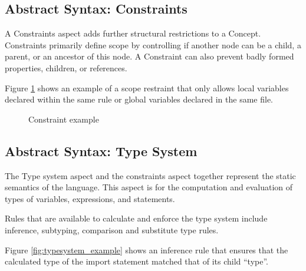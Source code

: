 \newpage
\subsection{Abstract Syntax: Constraints}
A Constraints aspect adds further structural restrictions to a Concept.
Constraints primarily define scope by controlling if another node can be a child, a parent, or an ancestor of this node.
A Constraint can also prevent badly formed properties, children, or references.

Figure \ref{fig:constraint_example} shows an example of a scope restraint that only allows local variables declared within the same rule or global variables declared in the same file.
 
\begin{figure}[h]
    \centering
    \caption{Constraint example}
    \label{fig:constraint_example}
\end{figure}

\subsection{Abstract Syntax: Type System}
The Type system aspect and the constraints aspect together represent the static semantics of the language.
This aspect is for the computation and evaluation of types of variables, expressions, and statements.

Rules that are available to calculate and enforce the type system include inference, subtyping, comparison and substitute type rules.

Figure \ref{fig:typesystem_example} shows an inference rule that ensures that the calculated type of the import statement matched that of its child ``type''.

